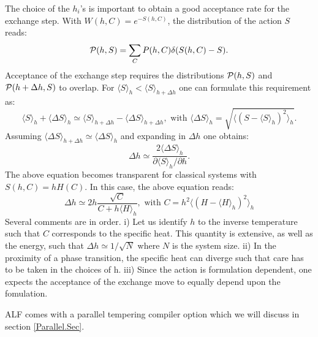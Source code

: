 The choice of the   $h_i$'s  is important  to  obtain a good acceptance rate for the exchange step.  With  $W(h,C)  = e^{- S(h,C) }$, the  distribution of the action $S$  reads:
\begin{equation}
	 {\cal P}( h, S ) =   \sum_{C}     P( h,C )   \delta ( S(h,C) -  S ). 
\end{equation} 
Acceptance of the exchange  step requires the distributions  ${ \cal P}( h, S )  $ and       ${ \cal P}( h  + \Delta h , S )  $ to overlap. For 
$\langle S \rangle_{h}  < \langle S \rangle_{h +  \Delta h} $   one can formulate this  requirement as:
\begin{equation}
	\langle S \rangle_{h}  +\langle \Delta S \rangle_{h}   \simeq \langle S \rangle_{h +  \Delta h}  - \langle \Delta S \rangle_{h + \Delta h} ,  \text{    with   }   
\langle \Delta S \rangle_{h}   =  \sqrt{ \langle \left(    S -  \langle S   \rangle_h  	\right)^2 \rangle_h} .
\end{equation}
Assuming  $ \langle \Delta S \rangle_{h + \Delta h}  \simeq \langle \Delta S \rangle_{h} $  and expanding in $\Delta h$ one obtains: 
\begin{equation}
	\Delta h \simeq \frac{ 2  \langle \Delta S \rangle_{h}    }{ \partial \langle S \rangle_{h} / \partial h}.  
\end{equation} 
The above equation becomes transparent  for  classical systems  with $ S(h,C) =  h H(C) $.  In this case, the above equation reads: 
\begin{equation}
	\Delta h       \simeq  2 h \frac{  \sqrt{C} } { C    + h \langle H \rangle_h},  \text{   with  } C = h^2    \langle \left(  H -  \langle H   \rangle_h \right)^2 \rangle_h
\end{equation} 
Several comments are in order. i)    Let us identify $h$ to the inverse temperature  such that $C$ corresponds to the specific heat. This quantity is extensive,  as well as the energy, such that $ \Delta h \simeq 1/{\sqrt{N}} $ where $N$ is the system size.   ii) In the proximity of a phase transition,   the specific heat can diverge such that   care has to be taken in the choices of  h.  iii)  Since the action is formulation dependent,   one expects the acceptance of the  exchange move to equally depend  upon the fomulation. 

 ALF  comes with a parallel tempering  compiler option which we will discuss  in section \ref{Parallel.Sec}. 
